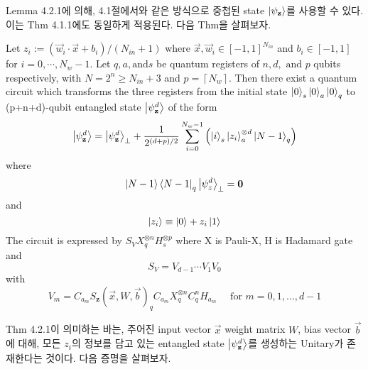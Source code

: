 Lemma 4.2.1에 의해, 4.1절에서와 같은 방식으로 중첩된 state \(\ket{\psi_{\mathbf z}}\)를 사용할 수 있다. 이는 Thm 4.1.1에도 동일하게 적용된다. 다음 Thm을 살펴보자.

\begin{theorem}
    Let \(z_i := \left( \vec{w}_i \cdot \vec{x} + b_i \right) / \left( N_{in} + 1 \right)\) where \(\vec{x}, \vec{w}_i \in [-1, 1]^{N_{in}}\) and \(b_i \in [-1, 1]\) for \(i = 0, \cdots, N_w - 1\). Let $q, a, \text{and} s$ be quantum registers of $n, d, \text{ and } p$ qubits respectively, with \( N = 2^n \ge N_{in} + 3 \) and \( p = \left\lceil N_{w} \right\rceil\). Then there exist a quantum circuit which transforms the three registers from the initial state \(\ket{0}_s \ket{0}_a \ket{0}_q\) to (p+n+d)-qubit entangled state \(\ket{\psi_{\mathbf z}^d}\) of the form
    \[
        \ket{\psi_{\mathbf z}^d} = \ket{\psi_{\mathbf z}^d}_{\perp} + {1 \over {2^{(d + p) / 2}}}\sum_{i=0}^{N_w - 1}\left( \ket{i}_{s} \ket{z_i}_{a}^{\otimes d} \ket{N-1}_q \right)
    \]
    where
    \[
        \ket{N-1}\bra{N-1}_q \ket{\psi_z^d}_{\perp} = \mathbf{0}
    \]
    and
    \[
        \ket{z_i} \equiv \ket{0} + z_i\ket{1}
    \]
    The circuit is expressed by $S_V X_q^{\otimes n} H_s^{\otimes p}$ where X is Pauli-X, H is Hadamard gate and
    \[
        S_V = V_{d-1} \cdots V_1 V_0
    \]
    with
    \[
        V_m = C_{a_m}S_{\mathbf{z}}(\vec{x}, W, \vec{b})_q C_{a_m}X^{\otimes n}_q C_q^nH_{a_m} \quad \text{ for } m = 0, 1, \dots, d - 1
    \]
\end{theorem}

Thm 4.2.1이 의미하는 바는, 주어진 input vector \(\vec x\) weight matrix \(W\), bias vector \(\vec b\)에 대해, 모든 \(z_i\)의 정보를 담고 있는 entangled state $\ket{\psi_{\mathbf z}^d}$를 생성하는 Unitary가 존재한다는 것이다. 다음 증명을 살펴보자.

